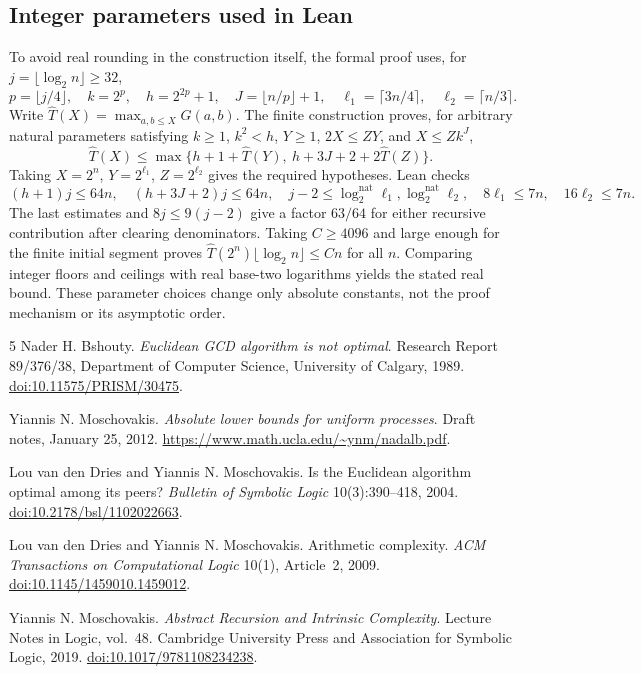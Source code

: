 \documentclass[11pt]{article}
\begin{document}
\subsection{Integer parameters used in Lean}
To avoid real rounding in the construction itself, the formal proof uses, for
$j=\lfloor\log_2 n\rfloor\geq32$,
\[
p=\lfloor j/4\rfloor,\quad k=2^p,\quad h=2^{2p}+1,\quad
J=\lfloor n/p\rfloor+1,\quad
\ell_1=\lceil3n/4\rceil,\quad \ell_2=\lceil n/3\rceil.
\]
Write $\widehat T(X)=\max_{a,b\leq X}G(a,b)$. The finite construction proves,
for arbitrary natural parameters satisfying $k\geq1$, $k^2<h$, $Y\geq1$,
$2X\leq ZY$, and $X\leq Zk^J$,
\[
\widehat T(X)\leq\max\{h+1+\widehat T(Y),\ h+3J+2+2\widehat T(Z)\}.
\]
Taking $X=2^n$, $Y=2^{\ell_1}$, $Z=2^{\ell_2}$ gives the required hypotheses.
Lean checks
\[
(h+1)j\leq64n,\quad (h+3J+2)j\leq64n,\quad
j-2\leq\log_2^{\mathrm{nat}}\ell_1,\log_2^{\mathrm{nat}}\ell_2,
\quad 8\ell_1\leq7n,\quad16\ell_2\leq7n.
\]
The last estimates and $8j\leq9(j-2)$ give a factor $63/64$ for either
recursive contribution after clearing denominators. Taking $C\geq4096$ and
large enough for the finite initial segment proves
$\widehat T(2^n)\lfloor\log_2 n\rfloor\leq Cn$ for all $n$.
Comparing integer floors and ceilings with real base-two logarithms yields the
stated real bound. These parameter choices change only absolute constants,
not the proof mechanism or its asymptotic order.

\begin{thebibliography}{5}
Nader H. Bshouty.
\emph{Euclidean GCD algorithm is not optimal}.
Research Report 89/376/38, Department of Computer Science, University of
Calgary, 1989.
\href{https://doi.org/10.11575/PRISM/30475}{doi:10.11575/PRISM/30475}.

Yiannis N. Moschovakis.
\emph{Absolute lower bounds for uniform processes}.
Draft notes, January 25, 2012.
\url{https://www.math.ucla.edu/~ynm/nadalb.pdf}.

Lou van den Dries and Yiannis N. Moschovakis.
Is the Euclidean algorithm optimal among its peers?
\emph{Bulletin of Symbolic Logic} 10(3):390--418, 2004.
\href{https://doi.org/10.2178/bsl/1102022663}{doi:10.2178/bsl/1102022663}.

Lou van den Dries and Yiannis N. Moschovakis.
Arithmetic complexity.
\emph{ACM Transactions on Computational Logic} 10(1), Article~2, 2009.
\href{https://doi.org/10.1145/1459010.1459012}{doi:10.1145/1459010.1459012}.

Yiannis N. Moschovakis.
\emph{Abstract Recursion and Intrinsic Complexity}.
Lecture Notes in Logic, vol.~48. Cambridge University Press and Association
for Symbolic Logic, 2019.
\href{https://doi.org/10.1017/9781108234238}{doi:10.1017/9781108234238}.
\end{thebibliography}
\end{document}
